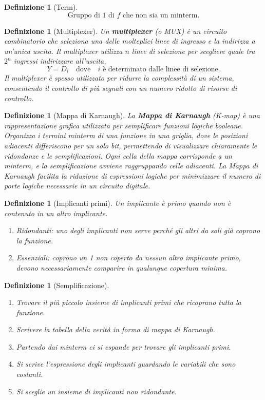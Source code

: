 \documentclass[a4paper,12pt]{article}
\theoremstyle{mystyle}
\newtheorem{definition}[theorem]{Definizione}
\begin{document}
\begin{definition}[Term]
    \[
        \text{Gruppo di 1 di \(f\) che non sia un minterm.}
    \]
\end{definition}

\begin{definition}[Multiplexer]
    Un \textbf{multiplexer} (o MUX) è un circuito combinatorio che seleziona una delle molteplici linee di ingresso e la indirizza a un'unica uscita. Il multiplexer utilizza \( n \) linee di selezione per scegliere quale tra \( 2^n \) ingressi indirizzare all'uscita.
    \[
        Y = D_i \quad \text{dove} \quad i \text{ è determinato dalle linee di selezione.}
    \]
    Il multiplexer è spesso utilizzato per ridurre la complessità di un sistema, consentendo il controllo di più segnali con un numero ridotto di risorse di controllo.
\end{definition}



\begin{definition}[Mappa di Karnaugh]
    La \textbf{Mappa di Karnaugh} (K-map) è una rappresentazione grafica utilizzata per semplificare funzioni logiche booleane. Organizza i termini minterm di una funzione in una griglia, dove le posizioni adiacenti differiscono per un solo bit, permettendo di visualizzare chiaramente le ridondanze e le semplificazioni.
    Ogni cella della mappa corrisponde a un minterm, e la semplificazione avviene raggruppando celle adiacenti.
    La Mappa di Karnaugh facilita la riduzione di espressioni logiche per minimizzare il numero di porte logiche necessarie in un circuito digitale.
\end{definition}

\begin{definition}[Implicanti primi]
    Un implicante è primo quando non è contenuto in un altro implicante.
    \begin{enumerate}
        \item Ridondanti: uno degli implicanti non serve perché gli altri da soli già coprono la funzione.
        \item Essenziali: coprono un 1 non coperto da nessun altro implicante primo, devono necessariamente comparire in qualunque copertura minima.
    \end{enumerate}
\end{definition}

\begin{definition}[Semplificazione]
    \begin{enumerate}
        \item Trovare il più piccolo insieme di implicanti primi che ricoprano tutta la funzione.
        \item Scrivere la tabella della verità in forma di mappa di Karnaugh.
        \item Partendo dai minterm ci si espande per trovare gli implicanti primi.
        \item Si scrive l'espressione degli implicanti guardando le variabili che sono costanti.
        \item Si sceglie un insieme di implicanti non ridondante.
    \end{enumerate}
\end{definition}
\end{document}

